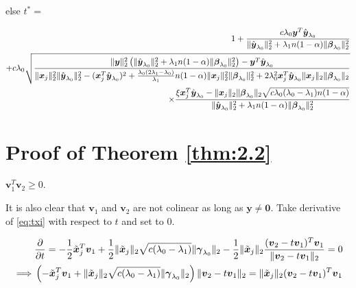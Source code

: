 else $t^*=$

\begin{gather}
    \begin{aligned}
        1+\frac{c\lambda_0\boldsymbol y^T\hat{\boldsymbol y}_{\lambda_0}}{\lVert\hat{\boldsymbol y}_{\lambda_0}\rVert_2^2+\lambda_1n(1-\alpha)\lVert\boldsymbol\beta_{\lambda_0}\rVert_2^2}\\
        +c\lambda_0\sqrt{\frac{\lVert\boldsymbol y\rVert_2^2\left(\lVert\hat{\boldsymbol y}_{\lambda_0}\rVert_2^2+\lambda_1n(1-\alpha)\lVert\boldsymbol\beta_{\lambda_0}\rVert_2^2\right)-\boldsymbol y^T\hat{\boldsymbol y}_{\lambda_0}}{\lVert\boldsymbol x_j\rVert_2^2\lVert\hat{\boldsymbol y}_{\lambda_0}\rVert_2^2-(\boldsymbol x_j^T\hat{\boldsymbol y}_{\lambda_0})^2+\frac{\lambda_0(2\lambda_1-\lambda_0)}{\lambda_1}n(1-\alpha)\lVert\boldsymbol x_j\rVert_2^2\lVert\boldsymbol\beta_{\lambda_0}\rVert_2^2+2\lambda_0^2\boldsymbol x_j^T\hat{\boldsymbol y}_{\lambda_0}\lVert\boldsymbol x_j\rVert_2\lVert\boldsymbol\beta_{\lambda_0}\rVert_2}}\\
        \times \frac{\xi \boldsymbol x_j^T\hat{\boldsymbol y}_{\lambda_0}-\lVert\boldsymbol x_j\rVert_2\lVert\boldsymbol\beta_{\lambda_0}\rVert_2\sqrt{c\lambda_0(\lambda_0-\lambda_1)n(1-\alpha)}}{\lVert\hat{\boldsymbol y}_{\lambda_0}\rVert_2^2+\lambda_1n(1-\alpha)\lVert\boldsymbol\beta_{\lambda_0}\rVert_2^2}
    \end{aligned}
\end{gather}

\section{Proof of Theorem \ref{thm:2.2}}

\begin{lemma}
    \label{lem:2.4.1}
    $\boldsymbol v_1^T \boldsymbol v_2\geq 0$.
\end{lemma}

It is also clear that $\boldsymbol v_1$ and $\boldsymbol v_2$ are not colinear as long as $\boldsymbol y\neq \boldsymbol0$. Take derivative of \eqref{eq:txi} with respect to $t$ and set to 0.

\begin{gather}
    \label{eq:2.4.1}
    \begin{aligned}
        &\frac{\partial}{\partial t}=-\frac{1}{2}\tilde{\boldsymbol x}_j^T\boldsymbol v_1+\frac{1}{2}\lVert\tilde{\boldsymbol x}_j\rVert_2\sqrt{c(\lambda_0-\lambda_1)}\lVert\boldsymbol\gamma_{\lambda_0}\rVert_2-\frac{1}{2}\lVert\tilde{\boldsymbol x}_j\rVert_2\frac{(\boldsymbol v_2-t\boldsymbol v_1)^T\boldsymbol v_1}{\lVert\boldsymbol v_2-t\boldsymbol v_1\rVert_2}=0\\
        \implies & \left(-\tilde{\boldsymbol x}_j^T\boldsymbol v_1+\lVert\tilde{\boldsymbol x}_j\rVert_2\sqrt{c(\lambda_0-\lambda_1)}\lVert\boldsymbol\gamma_{\lambda_0}\rVert_2\right)\lVert\boldsymbol v_2-t\boldsymbol v_1\rVert_2=\lVert\tilde{\boldsymbol x}_j\rVert_2(\boldsymbol v_2-t\boldsymbol v_1)^T\boldsymbol v_1
    \end{aligned}
\end{gather}


